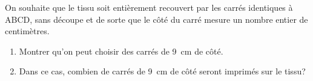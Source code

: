 \begin{enumerate}
On souhaite que le tissu soit entièrement recouvert par les carrés identiques à ABCD, sans découpe et de sorte que le côté du carré mesure un nombre entier de centimètres.
	\begin{enumerate}
		\item Montrer qu'on peut choisir des carrés de 9~cm de côté.
		\item Dans ce cas, combien de carrés de 9~cm de côté seront imprimés sur le tissu?
	\end{enumerate}
\end{enumerate}

\bigskip

